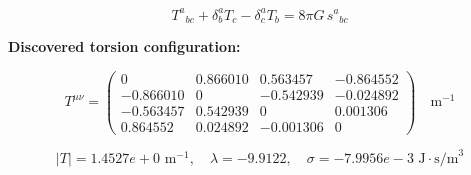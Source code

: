 
\begin{equation}
  T^a{}_{bc} + \delta^a_b T_c - \delta^a_c T_b = 8\pi G \, s^a{}_{bc}
\end{equation}

\textbf{Discovered torsion configuration:}

\begin{equation}
  T^{\mu\nu} = \begin{pmatrix}
    0 & 0.866010 & 0.563457 & -0.864552 \\
    -0.866010 & 0 & -0.542939 & -0.024892 \\
    -0.563457 & 0.542939 & 0 & 0.001306 \\
    0.864552 & 0.024892 & -0.001306 & 0
  \end{pmatrix} \quad \text{m}^{-1}
\end{equation}

\begin{equation}
  |T| = 1.4527e+0 \text{ m}^{-1}, \quad
  \lambda = -9.9122, \quad
  \sigma = -7.9956e-3 \text{ J}\cdot\text{s/m}^3
\end{equation}